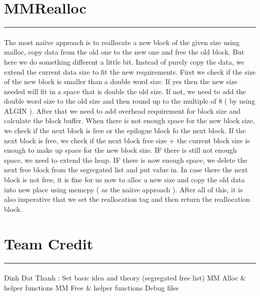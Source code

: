 \documentclass[a4paper]{article}
\newcommand\tab[1][1cm]{\hspace*{#1}}
\begin{document}
 

\section{MMRealloc}
\noindent\rule{2cm}{0.4pt}
\paragraph{}

The most naiive approach is to  reallocate a new block of the given size using malloc, copy data from the old one to the new one and free the old block. But here we do something different a little bit. Instead of purely copy the data, we extend the current data size to fit the new requirements. First we check if the size of the new block is smaller than a double word size. If yes then the new size needed will fit in a space that is double the old size. If not, we need to add the double word size to the old size and then round up to the multiple of 8 ( by using ALGIN ). After that we need to add overhead requirement for block size and calculate the block buffer. When there is not enough space for the new block size, we check if the next block is free or the epilogue block fo the next block. If the next block is free, we check if the next block free size + the current block size is enough to make up space for the new block size. IF there is still not enough space, we need to extend the heap. IF there is now enough space, we delete the next free block from the segregated list and put value in.  In case there the next block is not free, it is fine for us now to alloc a new size and copy the old data into new place using memcpy ( as the naiive approach ). After all of this, it is also imperative that we set  the reallocation tag and then return the reallocation block.

 

\paragraph{}



\section{Team Credit}
\noindent\rule{2cm}{0.4pt}

\paragraph{}
Dinh Dat Thanh : 
\newline
\tab \tab \tab Set basic idea and theory (segregated free list)  
\newline
\tab \tab \tab MM Alloc \& helper functions
\newline
\tab \tab \tab MM Free \& helper functions
\newline
\tab \tab \tab Debug files
\end{document}
